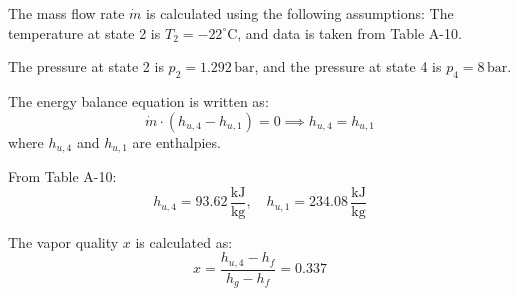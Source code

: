 The mass flow rate \( \dot{m} \) is calculated using the following assumptions:  
The temperature at state 2 is \( T_2 = -22^\circ\text{C} \), and data is taken from Table A-10.  

The pressure at state 2 is \( p_2 = 1.292 \, \text{bar} \), and the pressure at state 4 is \( p_4 = 8 \, \text{bar} \).  

The energy balance equation is written as:  
\[
\dot{m} \cdot (h_{u,4} - h_{u,1}) = 0 \implies h_{u,4} = h_{u,1}
\]  
where \( h_{u,4} \) and \( h_{u,1} \) are enthalpies.  

From Table A-10:  
\[
h_{u,4} = 93.62 \, \frac{\text{kJ}}{\text{kg}}, \quad h_{u,1} = 234.08 \, \frac{\text{kJ}}{\text{kg}}
\]  

The vapor quality \( x \) is calculated as:  
\[
x = \frac{h_{u,4} - h_f}{h_g - h_f} = 0.337
\]